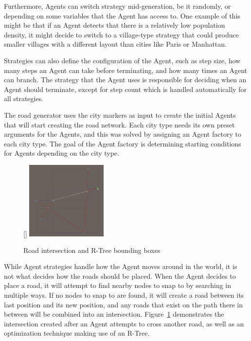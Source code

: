 Furthermore, Agents can switch strategy mid-generation, be it randomly, or depending on some variables that the Agent has access to.
One example of this might be that if an Agent detects that there is a relatively low population density, it might decide to switch to a village-type strategy that could produce smaller villages with a different layout than cities like Paris or Manhattan.

Strategies can also define the configuration of the Agent, such as step size, how many steps an Agent can take before terminating, and how many times an Agent can branch.
The strategy that the Agent uses is responsible for deciding when an Agent should terminate, except for step count which is handled automatically for all strategies.

The road generator uses the city markers as input to create the initial Agents that will start creating the road network.
Each city type needs its own preset arguments for the Agents, and this was solved by assigning an Agent factory to each city type.
The goal of the Agent factory is determining starting conditions for Agents depending on the city type.


\begin{figure}
  \centering
  \raisebox{0pt}[\dimexpr{}\baselineskip\relax]{
    \includegraphics[width=0.36\textwidth]{figure/road_intersection.png}
  }

  \caption{Road intersection and R-Tree bounding boxes}

  \label{fig:road_intersection}
\end{figure}

While Agent strategies handle how the Agent moves around in the world, it is not what decides how the roads should be placed.
When the Agent decides to place a road, it will attempt to find nearby nodes to snap to by searching in multiple ways.
If no nodes to snap to are found, it will create a road between its last position and its new position, and any roads that exist on the path there in between will be combined into an intersection.
Figure~\ref{fig:road_intersection} demonstrates the intersection created after an Agent attempts to cross another road, as well as an optimization technique making use of an R-Tree. %

